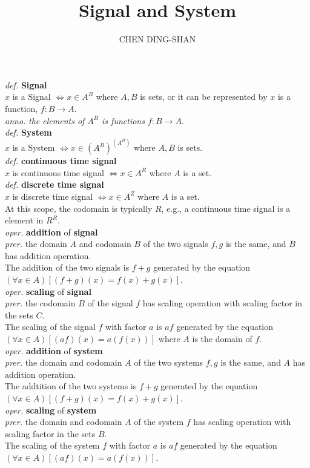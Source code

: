 \documentclass[16pt]{article}
\title{Signal and System}
\author{CHEN DING-SHAN}
\date{}
\newcommand{\sd}[1]{{\left(#1\right)}}
\newcommand{\df}[1]{\emph{def.} \textbf{#1}}
\newcommand{\anno}[1]{\emph{anno.} \emph{#1}}
\newcommand{\md}[1]{{\left[#1\right]}}
\newcommand{\prer}[1]{\emph{prer.} #1}
\newcommand{\oper}[2]{\emph{oper.} \textbf{#1} of \textbf{#2}}
\begin{document}
\maketitle
\noindent
\df{Signal}\\
$x$ is a Signal $\iff x \in A^B$ where $A, B$ is sets, or it can be represented by $x$ is a function, $f:B \to A$.\\
\anno{the elements of $A^B$ is functions $f:B \to A$}.\\
\df{System}\\
$x$ is a System $\iff x \in \sd{A^B}^\sd{A^B}$ where $A, B$ is sets.\\
\df{continuous time signal}\\
$x$ is continuous time signal $\iff x \in A^R$ where $A$ is a set.\\
\df{discrete time signal}\\
$x$ is discrete time signal $\iff x \in A^Z$ where $A$ is a set.\\
At this scope, the codomain is typically $R$, e.g., a continuous time signal is a element in $R^R$.\\
\oper{addition}{signal}\\
\prer{the domain $A$ and codomain $B$ of the two signals $f,g$ is the same, and $B$ has addition operation.}\\
The addition of the two signals is $f+g$ generated by the equation $\sd{\forall x \in A}\md{\sd{f+g}\sd{x} = f\sd{x} + g\sd{x}}$.\\
\oper{scaling}{signal}\\
\prer{the codomain $B$ of the signal $f$ has scaling operation with scaling factor in the sets $C$.}\\
The scaling of the signal $f$ with factor $a$ is $af$ generated by the equation $\sd{\forall x \in A}\md{\sd{af}\sd{x} = a\sd{f\sd{x}}}$ where $A$ is the domain of $f$.\\
\oper{addition}{system}\\
\prer{the domain and codomain $A$ of the two systems $f,g$ is the same, and $A$ has addition operation.}\\
The addtition of the two systems is $f+g$ generated by the equation $\sd{\forall x \in A}\md{\sd{f+g}\sd{x} = f\sd{x} + g\sd{x}}$.\\
\oper{scaling}{system}\\
\prer{the domain and codomain $A$ of the system $f$ has scaling operation with scaling factor in the sets $B$.}\\
The scaling of the system $f$ with factor $a$ is $af$ generated by the equation $\sd{\forall x \in A}\md{\sd{af}\sd{x} = a\sd{f\sd{x}}}$.\\
\end{document}
